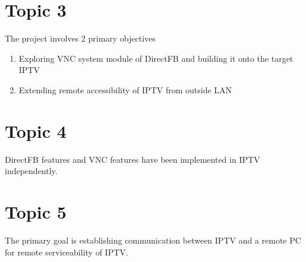 \section{Topic 3}
The project involves 2 primary objectives
\begin{enumerate}
	\item Exploring VNC system module of DirectFB and building it onto the target IPTV
	\item Extending remote accessibility of IPTV from outside LAN
\end{enumerate}

\section{Topic 4}
DirectFB features and VNC features have been implemented in IPTV independently.

\section{Topic 5}
The primary goal is establishing communication between IPTV and a remote PC for remote serviceability of IPTV.


